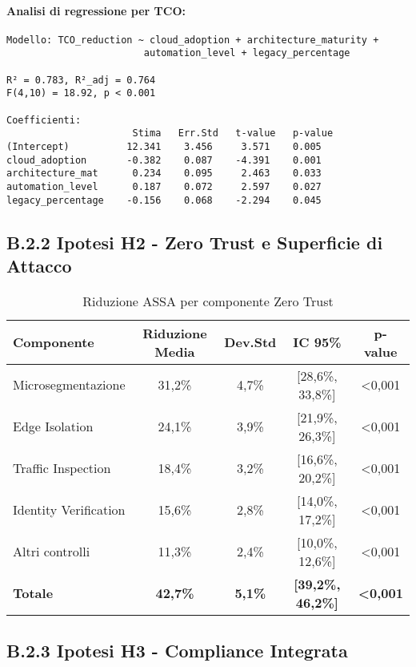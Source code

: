 \paragraph{Analisi di regressione per TCO:}
\begin{lstlisting}[basicstyle=\small\ttfamily]
Modello: TCO_reduction ~ cloud_adoption + architecture_maturity + 
                        automation_level + legacy_percentage

R² = 0.783, R²_adj = 0.764
F(4,10) = 18.92, p < 0.001

Coefficienti:
                      Stima   Err.Std   t-value   p-value
(Intercept)          12.341    3.456     3.571    0.005
cloud_adoption       -0.382    0.087    -4.391    0.001
architecture_mat      0.234    0.095     2.463    0.033
automation_level      0.187    0.072     2.597    0.027
legacy_percentage    -0.156    0.068    -2.294    0.045
\end{lstlisting}

\subsection{B.2.2 Ipotesi H2 - Zero Trust e Superficie di Attacco}

\begin{table}[htbp]
\centering
\caption{Riduzione ASSA per componente Zero Trust}
\label{tab:assa_reduction_appendix}
\begin{tabular}{lcccc}
\toprule
\textbf{Componente} & \textbf{Riduzione Media} & \textbf{Dev.Std} & \textbf{IC 95\%} & \textbf{p-value} \\
\midrule
Microsegmentazione & 31,2\% & 4,7\% & [28,6\%, 33,8\%] & <0,001 \\
Edge Isolation & 24,1\% & 3,9\% & [21,9\%, 26,3\%] & <0,001 \\
Traffic Inspection & 18,4\% & 3,2\% & [16,6\%, 20,2\%] & <0,001 \\
Identity Verification & 15,6\% & 2,8\% & [14,0\%, 17,2\%] & <0,001 \\
Altri controlli & 11,3\% & 2,4\% & [10,0\%, 12,6\%] & <0,001 \\
\midrule
\textbf{Totale} & \textbf{42,7\%} & \textbf{5,1\%} & \textbf{[39,2\%, 46,2\%]} & \textbf{<0,001} \\
\bottomrule
\end{tabular}
\end{table}

\subsection{B.2.3 Ipotesi H3 - Compliance Integrata}

